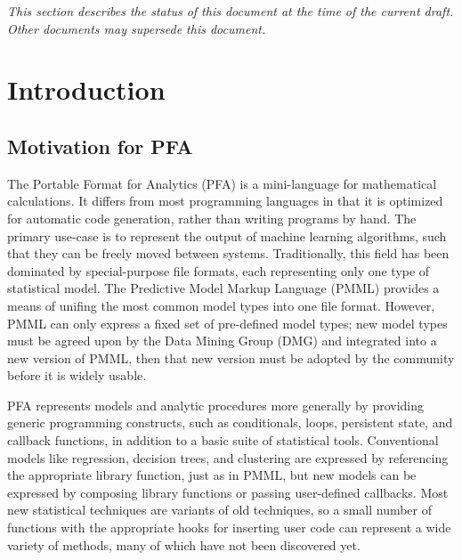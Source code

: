 \documentclass{article}
\begin{document}
{\it This section describes the status of this document at the time of the current draft.  Other documents may supersede this document.}

\tableofcontents

\pagebreak

\section{Introduction}

\subsection{Motivation for PFA}

The Portable Format for Analytics (PFA) is a mini-language for mathematical calculations.  It differs from most programming languages in that it is optimized for automatic code generation, rather than writing programs by hand.  The primary use-case is to represent the output of machine learning algorithms, such that they can be freely moved between systems.  Traditionally, this field has been dominated by special-purpose file formats, each representing only one type of statistical model.  The Predictive Model Markup Language (PMML) provides a means of unifing the most common model types into one file format.  However, PMML can only express a fixed set of pre-defined model types; new model types must be agreed upon by the Data Mining Group (DMG) and integrated into a new version of PMML, then that new version must be adopted by the community before it is widely usable.

PFA represents models and analytic procedures more generally by providing generic programming constructs, such as conditionals, loops, persistent state, and callback functions, in addition to a basic suite of statistical tools.  Conventional models like regression, decision trees, and clustering are expressed by referencing the appropriate library function, just as in PMML, but new models can be expressed by composing library functions or passing user-defined callbacks.  Most new statistical techniques are variants of old techniques, so a small number of functions with the appropriate hooks for inserting user code can represent a wide variety of methods, many of which have not been discovered yet.
\end{document}
